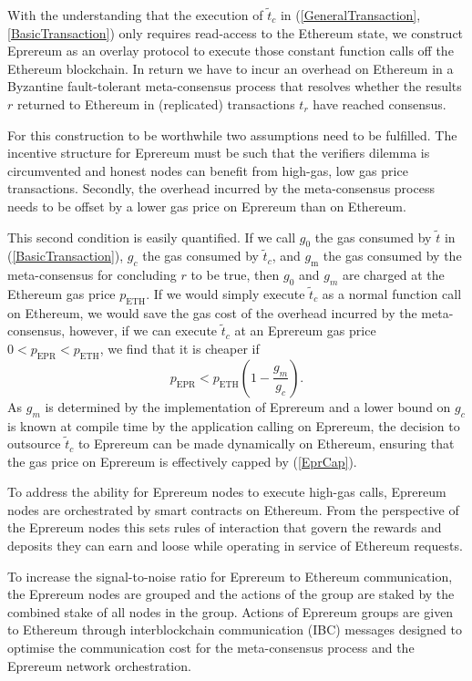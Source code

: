 \documentclass[twocolumn]{article}
\begin{document}
With the understanding that the execution of $\tilde{t}_c$ in (\ref{GeneralTransaction}, \ref{BasicTransaction}) only requires read-access to the Ethereum state, we construct Eprereum as an overlay protocol to execute those constant function calls off the Ethereum blockchain.  In return we have to incur an overhead on Ethereum in a Byzantine fault-tolerant meta-consensus process that resolves whether the results $r$ returned to Ethereum in (replicated) transactions $t_r$ have reached consensus.

For this construction to be worthwhile two assumptions need to be fulfilled. The incentive structure for Eprereum must be such that the verifiers dilemma is circumvented and honest nodes can benefit from high-gas, low gas price transactions.  Secondly, the overhead incurred by the meta-consensus process needs to be offset by a lower gas price on Eprereum than on Ethereum.

This second condition is easily quantified.  If we call $g_0$ the gas consumed by $\tilde{t}$ in (\ref{BasicTransaction}), $g_c$ the gas consumed by $\tilde{t}_c$, and $g_\text{m}$ the gas consumed by the meta-consensus for concluding $r$ to be true, then $g_0$ and $g_m$ are charged at the Ethereum gas price $p_\text{ETH}$.  If we would simply execute $\tilde{t}_c$ as a normal function call on Ethereum, we would save the gas cost of the overhead incurred by the meta-consensus, however, if we can execute $\tilde{t}_c$ at an Eprereum gas price $0 < p_\text{EPR} < p_\text{ETH}$, we find that it is cheaper if 
\begin{equation} \label{EprCap}
	p_\text{EPR} < p_\text{ETH}\left( 1 - \frac{g_m}{g_c} \right).
\end{equation}
As $g_m$ is determined by the implementation of Eprereum and a lower bound on $g_c$ is known at compile time by the application calling on Eprereum, the decision to outsource $\tilde{t}_c$ to Eprereum can be made dynamically on Ethereum, ensuring that the gas price on Eprereum is effectively capped by (\ref{EprCap}).

To address the ability for Eprereum nodes to execute high-gas calls, Eprereum nodes are orchestrated by smart contracts on Ethereum.  From the perspective of the Eprereum nodes this sets rules of interaction that govern the rewards and deposits they can earn and loose while operating in service of Ethereum requests.

To increase the signal-to-noise ratio for Eprereum to Ethereum communication, the Eprereum nodes are grouped and the actions of the group are staked by the combined stake of all nodes in the group. Actions of Eprereum groups are given to Ethereum through interblockchain communication (IBC) messages designed to optimise the communication cost for the meta-consensus process and the Eprereum network orchestration.  
\end{document}
